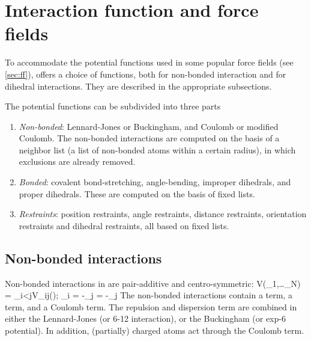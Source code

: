 % 
% 
% 
% 
% 
% 
% 
% 
%

\chapter{Interaction function and force fields}
\label{ch:ff}
To accommodate the potential functions used
in some popular force fields (see \ref{sec:ff}), {\gromacs} offers a choice of functions,
both for non-bonded interaction and for dihedral interactions. They
are described in the appropriate subsections.

The potential functions can be subdivided into three parts
\begin{enumerate}
\item   {\em Non-bonded}: Lennard-Jones or Buckingham, and Coulomb or
modified Coulomb. The non-bonded interactions are computed on the
basis of a neighbor list (a list of non-bonded atoms within a certain
radius), in which exclusions are already removed.
\item   {\em Bonded}: covalent bond-stretching, angle-bending,
improper dihedrals, and proper dihedrals. These are computed on the
basis of fixed lists. 
\item   {\em Restraints}: position restraints, angle restraints,
distance restraints, orientation restraints and dihedral restraints, all
based on fixed lists. 
\end{enumerate}

\section{Non-bonded interactions}
Non-bonded interactions in {\gromacs} are pair-additive and centro-symmetric:
\beq
V(_1,\ldots {}_N) = \sum_{i<j}V_{ij}(\rvij);
\eeq
\beq
{}_i = -\sum_j   = -_j
\eeq
The non-bonded interactions contain a  term, 
a 
term, and a Coulomb term. The repulsion and dispersion term are
combined in either the Lennard-Jones (or 6-12 interaction), or the
Buckingham (or exp-6 potential). In addition, (partially) charged atoms
act through the Coulomb term. 

